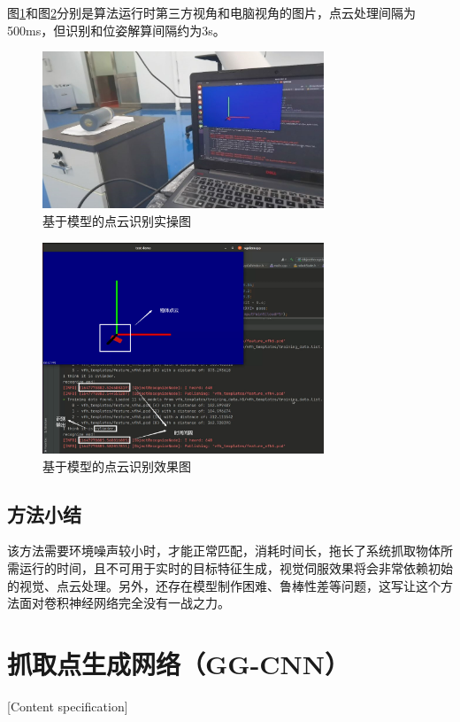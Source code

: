 \documentclass[fontset=fandol,type=bachelor,campus=harbin,bsmainpagenumberline=true]{hithesisbook}
\begin{document}
图\ref{基于模型的点云识别实操图}和图\ref{基于模型的点云识别效果图}分别是算法运行时第三方视角和电脑视角的图片，点云处理间隔为500ms，但识别和位姿解算间隔约为3s。
\newpage
\begin{figure}[h]
\centering
\includegraphics[width = 0.75\textwidth]{chapter3/基于模型的点云识别实操图}
\caption{基于模型的点云识别实操图}
\label{基于模型的点云识别实操图}
\end{figure}

\begin{figure}[h]
\centering
\includegraphics[width = 0.75\textwidth]{chapter3/基于模型的点云识别效果图}
\caption{基于模型的点云识别效果图}
\label{基于模型的点云识别效果图}
\end{figure}
\subsection{方法小结}
该方法需要环境噪声较小时，才能正常匹配，消耗时间长，拖长了系统抓取物体所需运行的时间，且不可用于实时的目标特征生成，视觉伺服效果将会非常依赖初始的视觉、点云处理。另外，还存在模型制作困难、鲁棒性差等问题，这写让这个方法面对卷积神经网络完全没有一战之力。


\section{抓取点生成网络（GG-CNN）}[Content specification]
\end{document}
